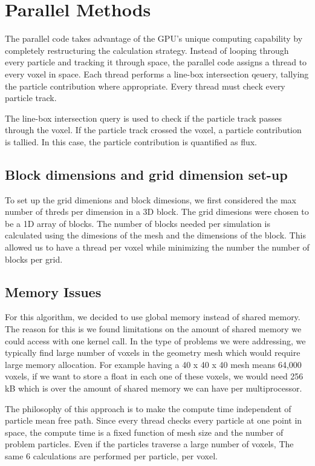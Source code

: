 \section{Parallel Methods}
The parallel code takes advantage of the GPU's unique computing capability by
completely restructuring the calculation strategy. Instead of looping through
every particle and tracking it through space, the parallel code assigns a thread
to every voxel in space. Each thread performs a line-box intersection qeuery,
tallying the particle contribution where appropriate. Every thread must check
every particle track. 

The line-box intersection query is used to check if the particle track passes 
through the voxel. If the particle track crossed the voxel, a particle contribution 
is tallied. In this case, the particle contribution is quantified as flux. 

\subsection{Block dimensions and grid dimension set-up}
To set up the grid dimenions and block dimesions, we first considered the max number of 
threds per dimension in a 3D block. 
The grid dimesions were chosen to be a 1D array of blocks. The number of blocks 
needed per simulation is calculated using the dimesions of the mesh and the 
dimensions of the block. This allowed us to have a thread per voxel  while 
minimizing the number the number of blocks per grid. 

\subsection{Memory Issues}
For this algorithm, we decided to use global memory instead of shared memory. 
The reason for this is we found limitations on the amount of shared memory we 
could access with one kernel call. In the type of problems we were addressing, 
we typically find large number of voxels in the geometry mesh which would require 
large memory allocation. For example having a 40 x 40 x 40 mesh means 64,000 
voxels, if we want to store a float in each one of these voxels, we would need 
256 kB which is over the amount of shared memory we can have per multiprocessor.   


The philosophy of this approach is to make the compute time independent of
particle mean free path. Since every thread checks every particle at one point
in space, the compute time is a fixed function of mesh size and the number of
problem particles. Even if the particles traverse a large number of voxels, The
same 6 calculations are performed per particle, per voxel.

